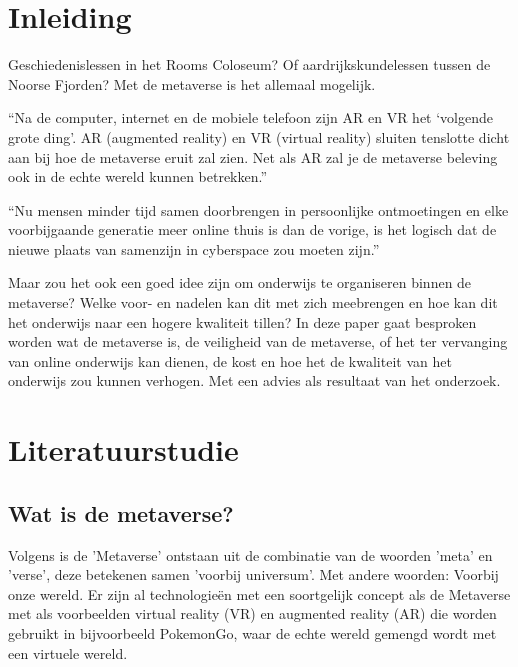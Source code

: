\documentclass{hogent-article}
\affiliation{
  \textsuperscript{1} \href{mailto:wout.demaeseneer@student.hogent.be}{mailto:wout.demaeseneer@student.hogent.be}}
\begin{document}
\flushbottom %
\maketitle %
\tableofcontents %
\thispagestyle{empty} %


\section{Inleiding}
Geschiedenislessen in het Rooms Coloseum? Of aardrijkskundelessen tussen de Noorse Fjorden? Met de metaverse is het allemaal mogelijk.

``Na de computer, internet en de mobiele telefoon zijn AR en VR het ‘volgende grote ding’. AR (augmented reality) en VR (virtual reality) sluiten tenslotte dicht aan bij hoe de metaverse eruit zal zien. Net als AR zal je de metaverse beleving ook in de echte wereld kunnen betrekken.'' \autocite{Kamenov2017}

``Nu mensen minder tijd samen doorbrengen in persoonlijke ontmoetingen en elke voorbijgaande generatie meer online thuis is dan de vorige, is het logisch dat de nieuwe plaats van samenzijn in cyberspace zou moeten zijn.''\autocite{Phemex}

Maar zou het ook een goed idee zijn om onderwijs te organiseren binnen de metaverse? Welke voor- en nadelen kan dit met zich meebrengen en hoe kan dit het onderwijs naar een hogere kwaliteit tillen? In deze paper gaat besproken worden wat de metaverse is, de veiligheid van de metaverse, of het ter vervanging van online onderwijs kan dienen, de kost en hoe het de kwaliteit van het onderwijs zou kunnen verhogen. Met een advies als resultaat van het onderzoek.


\section{Literatuurstudie}
\subsection{Wat is de metaverse?}
Volgens \textcite{Phemex} is de 'Metaverse' ontstaan uit de combinatie van de woorden 'meta' en 'verse', deze betekenen samen 'voorbij universum'. Met andere woorden: Voorbij onze wereld. Er zijn al technologieën met een soortgelijk concept als de Metaverse met als voorbeelden virtual reality (VR) en augmented reality (AR) die worden gebruikt in bijvoorbeeld PokemonGo, waar de echte wereld gemengd wordt met een virtuele wereld.
\end{document}
